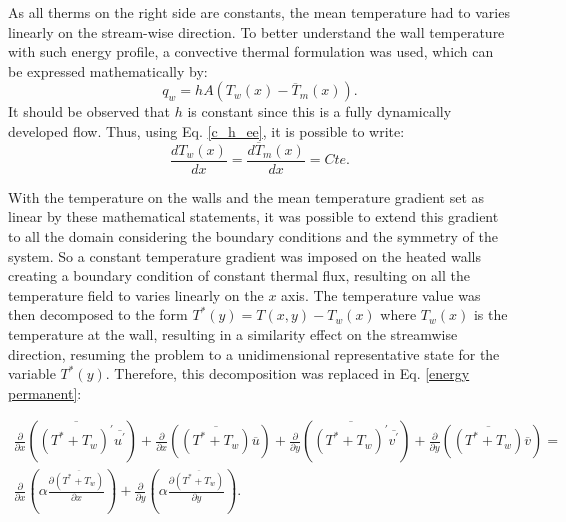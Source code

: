 \documentclass[10pt]{article} %
\begin{document}
As all therms on the right side are constants, the mean temperature had to varies linearly on the stream-wise direction.  
To better understand the wall temperature with such energy profile, a convective thermal formulation was used, which can be expressed mathematically by:
\begin{equation}
q_w = h A \left( T_w(x) - \overline{T}_m(x)\right).
\end{equation}
It should be observed that $h$ is constant since this is a fully dynamically developed flow. Thus, using Eq. \ref{c_h_ee}, it is possible to write:
\begin{equation}
\frac{d T_w(x)}{d x} = \frac{d \overline{T}_m(x)}{d x} = Cte.
\end{equation}	

With the temperature on the walls and the mean temperature gradient set as linear by these mathematical statements, it was possible to extend this gradient to all the domain considering the boundary conditions and the symmetry of the system. So a constant temperature gradient was imposed on the heated walls creating a boundary condition of constant thermal flux, resulting on all the temperature field to varies linearly on the $x$ axis. The temperature value was then decomposed to the form $ T^\ast(y) = T(x,y) - T_w(x) $ where $T_w(x)$ is the temperature at the wall, resulting in a similarity effect on the streamwise direction, resuming the problem to a unidimensional representative state for the variable $T^\ast(y)$. Therefore, this decomposition was replaced in Eq. \ref{energy permanent}:



\begin{equation}
\begin{split}
\frac{\partial{}}{\partial{x}} \left(\overline{(T^\ast + T_w)^\prime} \overline{ u^\prime}\right) + \frac{\partial{}}{\partial{x}}\left(\overline{(T^\ast + T_w)} \overline{u}\right)+ 
\frac{\partial{}}{\partial{y}} \left(\overline{(T^\ast + T_w)^\prime} \overline{ v^\prime}\right) + \frac{\partial{}}{\partial{y}}\left(\overline{(T^\ast + T_w)} \overline{v}\right) = \\
{\frac{\partial{}}{\partial{x}}} \left(\alpha {\frac{\partial{\overline{(T^\ast + T_w)}}}{\partial{x}}} \right) +
{\frac{\partial{}}{\partial{y}}} \left(\alpha {\frac{\partial{\overline{(T^\ast + T_w)}}}{\partial{y}}} \right). 
\end{split}
\end{equation}
\end{document}
